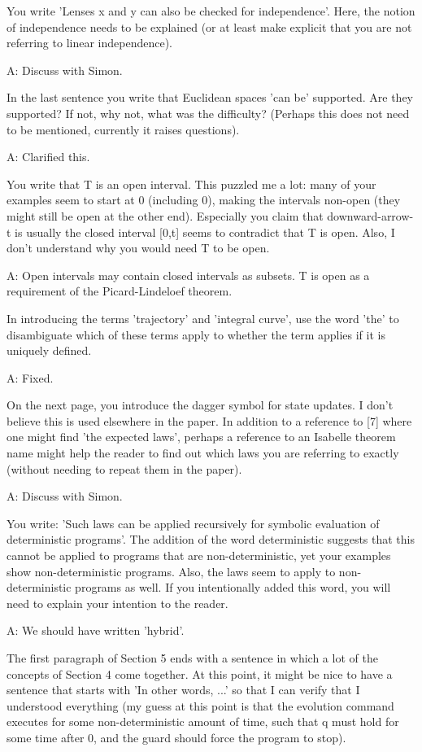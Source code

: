 \documentclass[envcountsame,envcountsect]{llncs}
\begin{document}
You write 'Lenses x and y can also be checked for independence'. Here, the notion of independence needs to be explained (or at least make explicit that you are not referring to linear independence). 

A: Discuss with Simon.

In the last sentence you write that Euclidean spaces 'can be' supported. Are they supported? If not, why not, what was the difficulty? (Perhaps this does not need to be mentioned, currently it raises questions).

A: Clarified this.

You write that T is an open interval. This puzzled me a lot: many of your examples seem to start at 0 (including 0), making the intervals non-open (they might still be open at the other end). Especially you claim that downward-arrow-t is usually the closed interval [0,t] seems to contradict that T is open. Also, I don't understand why you would need T to be open.

A: Open intervals may contain closed intervals as subsets. T is open as a requirement of the Picard-Lindeloef theorem.

In introducing the terms 'trajectory' and 'integral curve', use the word 'the' to disambiguate which of these terms apply to whether the term applies if it is uniquely defined.

A: Fixed.

On the next page, you introduce the dagger symbol for state updates. I don't believe this is used elsewhere in the paper. In addition to a reference to [7]  where one might find 'the expected laws', perhaps a reference to an Isabelle theorem name might help the reader to find out which laws you are referring to exactly (without needing to repeat them in the paper).

A: Discuss with Simon.

You write: 'Such laws can be applied recursively for symbolic evaluation of deterministic programs'. The addition of the word deterministic suggests that this cannot be applied to programs that are non-deterministic, yet your examples show non-deterministic programs. Also, the laws seem to apply to non-deterministic programs as well. If you intentionally added this word, you will need to explain your intention to the reader.

A: We should have written 'hybrid'.

The first paragraph of Section 5 ends with a sentence in which a lot of the concepts of Section 4 come together. At this point, it might be nice to have a sentence that starts with 'In other words, ...' so that I can verify that I understood everything (my guess at this point is that the evolution command executes for some non-deterministic amount of time, such that q must hold for some time after 0, and the guard should force the program to stop).
\end{document}
